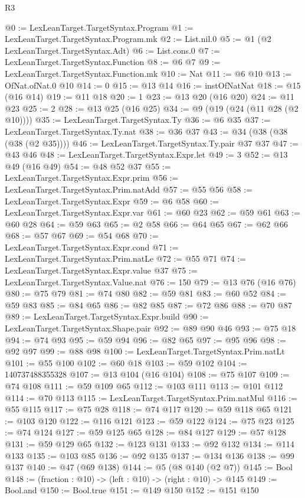 \begin{lexlean}{R3}
\begin{coremodule}
@0 := LexLeanTarget.TargetSyntax.Program
@1 := LexLeanTarget.TargetSyntax.Program.mk
@2 := List.nil.{0}
@5 := @1 (@2 LexLeanTarget.TargetSyntax.Adt)
@6 := List.cons.{0}
@7 := LexLeanTarget.TargetSyntax.Function
@8 := @6 @7
@9 := LexLeanTarget.TargetSyntax.Function.mk
@10 := Nat
@11 := @6 @10
@13 := OfNat.ofNat.{0} @10
@14 := 0
@15 := @13 @14
@16 := instOfNatNat
@18 := @15 (@16 @14)
@19 := @11 @18
@20 := 1
@23 := @13 @20 (@16 @20)
@24 := @11 @23
@25 := 2
@28 := @13 @25 (@16 @25)
@34 := @9 (@19 (@24 (@11 @28 (@2 @10))))
@35 := LexLeanTarget.TargetSyntax.Ty
@36 := @6 @35
@37 := LexLeanTarget.TargetSyntax.Ty.nat
@38 := @36 @37
@43 := @34 (@38 (@38 (@38 (@2 @35))))
@46 := LexLeanTarget.TargetSyntax.Ty.pair @37 @37
@47 := @43 @46
@48 := LexLeanTarget.TargetSyntax.Expr.let
@49 := 3
@52 := @13 @49 (@16 @49)
@54 := @48 @52 @37
@55 := LexLeanTarget.TargetSyntax.Expr.prim
@56 := LexLeanTarget.TargetSyntax.Prim.natAdd
@57 := @55 @56
@58 := LexLeanTarget.TargetSyntax.Expr
@59 := @6 @58
@60 := LexLeanTarget.TargetSyntax.Expr.var
@61 := @60 @23
@62 := @59 @61
@63 := @60 @28
@64 := @59 @63
@65 := @2 @58
@66 := @64 @65
@67 := @62 @66
@68 := @57 @67
@69 := @54 @68
@70 := LexLeanTarget.TargetSyntax.Expr.cond
@71 := LexLeanTarget.TargetSyntax.Prim.natLe
@72 := @55 @71
@74 := LexLeanTarget.TargetSyntax.Expr.value @37
@75 := LexLeanTarget.TargetSyntax.Value.nat
@76 := 150
@79 := @13 @76 (@16 @76)
@80 := @75 @79
@81 := @74 @80
@82 := @59 @81
@83 := @60 @52
@84 := @59 @83
@85 := @84 @65
@86 := @82 @85
@87 := @72 @86
@88 := @70 @87
@89 := LexLeanTarget.TargetSyntax.Expr.build
@90 := LexLeanTarget.TargetSyntax.Shape.pair
@92 := @89 @90 @46
@93 := @75 @18
@94 := @74 @93
@95 := @59 @94
@96 := @82 @65
@97 := @95 @96
@98 := @92 @97
@99 := @88 @98
@100 := LexLeanTarget.TargetSyntax.Prim.natLt
@101 := @55 @100
@102 := @60 @18
@103 := @59 @102
@104 := 140737488355328
@107 := @13 @104 (@16 @104)
@108 := @75 @107
@109 := @74 @108
@111 := @59 @109 @65
@112 := @103 @111
@113 := @101 @112
@114 := @70 @113
@115 := LexLeanTarget.TargetSyntax.Prim.natMul
@116 := @55 @115
@117 := @75 @28
@118 := @74 @117
@120 := @59 @118 @65
@121 := @103 @120
@122 := @116 @121
@123 := @59 @122
@124 := @75 @23
@125 := @74 @124
@127 := @59 @125 @65
@128 := @84 @127
@129 := @57 @128
@131 := @59 @129 @65
@132 := @123 @131
@133 := @92 @132
@134 := @114 @133
@135 := @103 @85
@136 := @92 @135
@137 := @134 @136
@138 := @99 @137
@140 := @47 (@69 @138)
@144 := @5 (@8 @140 (@2 @7))
@145 := Bool
@148 := (fraction : @10) -> (left : @10) -> (right : @10) -> @145
@149 := Bool.and
@150 := Bool.true
@151 := @149 @150
@152 := @151 @150

\end{coremodule}
\end{lexlean}
